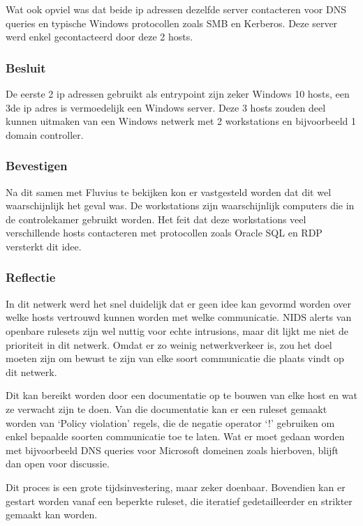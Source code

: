\documentclass[a4paper, 12pt]{report}
\begin{document}
Wat ook opviel was dat beide ip adressen dezelfde server contacteren voor DNS queries en typische Windows protocollen zoals SMB en Kerberos.
Deze server werd enkel gecontacteerd door deze 2 hosts. 

\subsubsection{Besluit}
De eerste 2 ip adressen gebruikt als entrypoint zijn zeker Windows 10 hosts, een 3de ip adres is vermoedelijk een Windows server.
Deze 3 hosts zouden deel kunnen uitmaken van een Windows netwerk met 2 workstations en bijvoorbeeld 1 domain controller.

\subsubsection{Bevestigen}
Na dit samen met Fluvius te bekijken kon er vastgesteld worden dat dit wel waarschijnlijk het geval was.
De workstations zijn waarschijnlijk computers die in de controlekamer gebruikt worden.
Het feit dat deze workstations veel verschillende hosts contacteren met protocollen zoals Oracle SQL en RDP versterkt dit idee.

\subsubsection{Reflectie}
In dit netwerk werd het snel duidelijk dat er geen idee kan gevormd worden over welke hosts vertrouwd kunnen worden met welke communicatie.
NIDS alerts van openbare rulesets zijn wel nuttig voor echte intrusions, maar dit lijkt me niet de prioriteit in dit netwerk.
Omdat er zo weinig netwerkverkeer is, zou het doel moeten zijn om bewust te zijn van elke soort communicatie die plaats vindt op dit netwerk.

Dit kan bereikt worden door een documentatie op te bouwen van elke host en wat ze verwacht zijn te doen.
Van die documentatie kan er een ruleset gemaakt worden van `Policy violation' regels, die de negatie operator `!' gebruiken om enkel bepaalde soorten communicatie toe te laten.
Wat er moet gedaan worden met bijvoorbeeld DNS queries voor Microsoft domeinen zoals hierboven, blijft dan open voor discussie.

Dit proces is een grote tijdsinvestering, maar zeker doenbaar.
Bovendien kan er gestart worden vanaf een beperkte ruleset, die iteratief gedetailleerder en strikter gemaakt kan worden.

\end{document}
